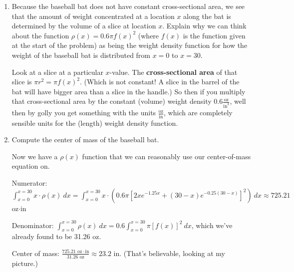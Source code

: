 \documentclass[10pt]{article}
\newenvironment{red}{\color{red}}{\ignorespacesafterend}
\begin{document}
\begin{enumerate}[leftmargin=0pt]
\begin{enumerate}
    \begin{red}
    Check the units: since our constant weight density is given in $\frac{\text{oz}}{\text{in}^3}$, and since our volume we just computed was in $\text{in}^3$, we just have to multiply:
    \[0.6\frac{\text{oz}}{\text{in}^3} \cdot 52.1 \text{ in}^3 \approx 31.26 \text{ oz}. \]
    \end{red}
    
    \item Because the baseball bat does not have constant cross-sectional area, we see that the amount of weight concentrated at a location $x$ along the bat is determined by the volume of a slice at location $x$. Explain why we can think about the function $\rho(x) = 0.6 \pi f(x)^2$ (where $f(x)$ is the function given at the start of the problem) as being the weight density function for how the weight of the baseball bat is distributed from $x=0$ to $x=30$.
    
    \begin{red}
    Look at a slice at a particular $x$-value. The \textbf{cross-sectional area} of that slice is $\pi r^2 = \pi f(x)^2$. (Which is not constant! A slice in the barrel of the bat will have bigger area than a slice in the handle.) So then if you multiply that cross-sectional area by the constant (volume) weight density $0.6\frac{\text{oz}}{\text{in}^3}$, well then by golly you get something with the units $\frac{\text{oz}}{\text{in}}$, which are completely sensible units for the (length) weight density function.
    \end{red}
    
    \item Compute the center of mass of the baseball bat.
    
    \begin{red}
    Now we have a $\rho(x)$ function that we can reasonably use our center-of-mass equation on. 
    
    Numerator: $\int_{x=0}^{x=30} x\cdot\rho(x)\ dx = \int_{x=0}^{x=30} x\cdot \left(0.6\pi [2xe^{-1.25x} + (30-x) e^{-0.25(30-x)}]^2\right)\ dx \approx 725.21$ oz$\cdot$in
    
    Denominator: $\int_{x=0}^{x=30} \rho(x)\ dx = 0.6 \int_{x=0}^{x=30} \pi[f(x)]^2\ dx$, which we've already found to be 31.26 oz.
    
    Center of mass: $\frac{725.21 \text{ oz}\cdot\text{in}}{31.26\text{ oz}} \approx 23.2$ in. (That's believable, looking at my picture.)
    \end{red}
    
    
\end{enumerate}

\end{enumerate}
\end{document}
